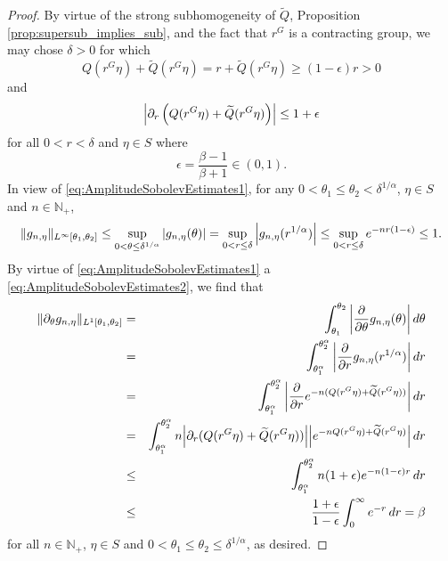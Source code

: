 \documentclass[11pt]{article}
\begin{document}
\begin{proof}
By virtue of the strong subhomogeneity of $\widetilde{Q}$, Proposition \ref{prop:supersub_implies_sub}, and the fact that $r^G$ is a contracting group, we may chose $\delta>0$ for which 
\begin{equation}\label{eq:AmplitudeSobolevEstimates1}
    Q(r^G\eta)+\widetilde{Q}\left(r^G\eta\right)=r+\widetilde{Q}\left(r^G\eta\right)\geq (1-\epsilon)r>0
\end{equation}
and
\begin{equation}\label{eq:AmplitudeSobolevEstimates2}
    \abs{\partial_r\left(Q(r^G\eta)+\widetilde{Q}(r^G\eta)\right)}\leq 1+\epsilon
\end{equation}
for all $0<r<\delta$ and $\eta\in S$ where
\begin{equation*}
    \epsilon=\frac{\beta-1}{\beta+1}\in(0,1).
\end{equation*}
In view of \eqref{eq:AmplitudeSobolevEstimates1}, for any $0<\theta_1\leq\theta_2<\delta^{1/\alpha}$, $\eta\in S$ and $n\in\mathbb{N}_+$,
\begin{equation*}
\|g_{n,\eta}\|_{L^\infty[\theta_1,\theta_2]}\leq\sup_{0<\theta\leq\delta^{1/\alpha}}\abs{g_{n,\eta}(\theta)}=\sup_{0<r\leq\delta}\abs{g_{n,\eta}(r^{1/\alpha})}\leq \sup_{0<r\leq \delta}e^{-nr(1-\epsilon)}\leq 1.
\end{equation*}
By virtue of \eqref{eq:AmplitudeSobolevEstimates1} a \eqref{eq:AmplitudeSobolevEstimates2}, we find that
\begin{eqnarray*}
\|\partial_{\theta}g_{n,\eta}\|_{L^1[\theta_1,\theta_2]}&=&\int_{\theta_1}^{\theta_2}\abs{\frac{\partial}{\partial \theta}g_{n,\eta}(\theta)}\,d\theta\\
&=&\int_{\theta_1^{\alpha}}^{\theta_2^\alpha}\abs{\frac{\partial}{\partial r}g_{n,\eta}(r^{1/\alpha})}\,dr\\
&=&\int_{\theta_1^\alpha}^{\theta_2^\alpha}\abs{\frac{\partial}{\partial r}e^{-n(Q(r^G\eta)+\widetilde{Q}(r^G\eta))} }\,dr\\
&=&\int_{\theta_1^\alpha}^{\theta_2^\alpha}n\abs{\partial_r(Q(r^G\eta)+\widetilde{Q}(r^G\eta))}\abs{e^{-nQ(r^G\eta)+\widetilde{Q}(r^G\eta)}}\,dr\\
&\leq&\int_{\theta_1^\alpha}^{\theta_2^\alpha}n(1+\epsilon)e^{-n(1-\epsilon)r}\,dr\\
&\leq &\frac{1+\epsilon}{1-\epsilon}\int_0^\infty e^{-r}\,dr=\beta
\end{eqnarray*}
for all $n\in\mathbb{N}_+$, $\eta\in S$ and $0<\theta_1\leq\theta_2\leq\delta^{1/\alpha}$, as desired.
\end{proof}
\end{document}
